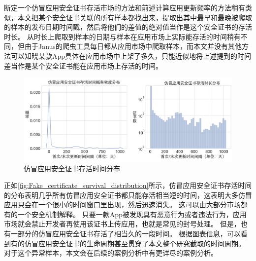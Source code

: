 断定一个仿冒应用安全证书存活市场的方法和前述计算应用更新频率的方法稍有类似，本文把某个安全证书关联的所有样本都找出来，提取出其中最早和最晚被爬取的样本的发布日期时间戳，然后将他们的差值的绝对值当作是这个安全证书的存活时长。
从时长上爬取到样本的日期与样本在应用市场上实际能存活的时间稍有不同，但由于Janus的爬虫工具每日都从应用市场中爬取样本，而本文并没有其他方法可以知晓某款App具体在应用市场中上架了多久，只能近似地将上述提到的时间差当作是某个安全证书能在应用市场上存活的时间。

\begin{figure}[htbp]
	\centering
	\includegraphics[width=\textwidth]{./Figures/edwin-Fake_certificate_survival_distribution2.png}
	\caption{仿冒应用安全证书存活时间分布}
	\label{fig:Fake_certificate_survival_distribution}
\end{figure}

正如\autoref{fig:Fake_certificate_survival_distribution}所示，仿冒应用安全证书存活时间的分布表明几乎所有仿冒应用安全证书都只能存活相当短的时间，这表明大多仿冒应用只会在一个很小的时间窗口里出现，然后迅速消失。
这可以由大部分市场都有的一个安全机制解释。
只要一款App被发现具有恶意行为或者违法行为，应用市场就会禁止开发者再使用该证书上传应用，也就是常见的封号处理。
但是，也有一部分的仿冒应用安全证书存活了相当久的一段时间。
根据图表信息，可以看到有的仿冒应用安全证书的生命周期甚至贯穿了本文整个研究截取的时间周期。
对于这个异常样本，本文会在后续的案例分析中有更详尽的案例分析。

